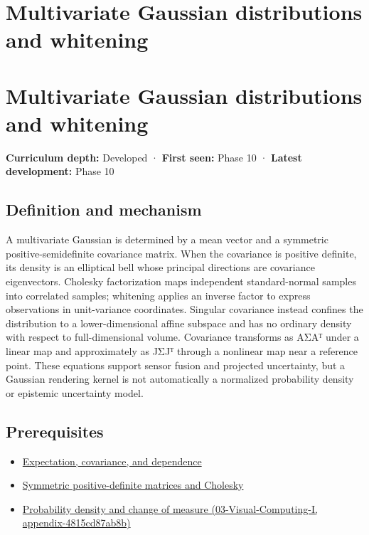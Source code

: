 \hypertarget{appendix-12bbe185dbe5}{}
\section*{Multivariate Gaussian distributions and whitening}
\section{Multivariate Gaussian distributions and whitening}\label{multivariate-gaussian-distributions-and-whitening}

\textbf{Curriculum depth:} Developed · \textbf{First seen:} Phase 10 · \textbf{Latest development:} Phase 10

\subsection{Definition and mechanism}\label{definition-and-mechanism}

A multivariate Gaussian is determined by a mean vector and a symmetric positive-semidefinite covariance matrix. When the covariance is positive definite, its density is an elliptical bell whose principal directions are covariance eigenvectors. Cholesky factorization maps independent standard-normal samples into correlated samples; whitening applies an inverse factor to express observations in unit-variance coordinates. Singular covariance instead confines the distribution to a lower-dimensional affine subspace and has no ordinary density with respect to full-dimensional volume. Covariance transforms as AΣAᵀ under a linear map and approximately as JΣJᵀ through a nonlinear map near a reference point. These equations support sensor fusion and projected uncertainty, but a Gaussian rendering kernel is not automatically a normalized probability density or epistemic uncertainty model.

\subsection{Prerequisites}\label{prerequisites}

\begin{itemize}
\tightlist
\item
  \hyperref[appendix-54c383df9992]{Expectation, covariance, and dependence}
\item
  \hyperref[appendix-50d2ea3c9b26]{Symmetric positive-definite matrices and Cholesky}
\item
  \href{}{Probability density and change of measure (03-Visual-Computing-I, appendix-4815cd87ab8b)}
\end{itemize}


